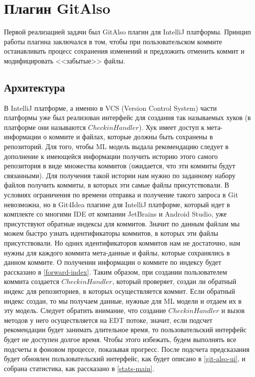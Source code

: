 \documentclass[times]{itmo-student-thesis}
\begin{document}
\section{Плагин GitAlso}
Первой реализацией задачи был GitAlso плагин для IntelliJ платформы. Принцип работы плагина заключался в том, чтобы при пользовательском коммите останавливать процесс сохранения изменений и предложить отменить коммит и модифицировать <<забытые>> файлы.
\subsection{Архитектура}
В IntelliJ платформе, а именно в VCS (Version Control System) части платформы уже был реализован интерфейс для создания так называемых хуков (в платформе они называются $CheckinHandler$). Хук имеет доступ к мета-информации о коммите и файлах, которые должны быть сохранены в репозиторий. Для того, чтобы ML модель выдала рекомендацию следует в дополнение к имеющейся информации получить историю этого самого репозитория в виде множества коммитов (ожидается, что эти коммиты будут связанными). Для получения такой истории нам нужно по заданному набору файлов получить коммиты, в которых эти самые файлы присутствовали. В условиях ограничения по времени отправка и получение такого запроса в Git невозможна, но в Git4Idea плагине для IntelliJ платформе, который идет в комплекте со многими IDE от компании JetBrains и Android Studio, уже присутствуют обратные индексы для коммитов. Значит по данным файлам мы можем быстро узнать идентификаторы коммитов, в которых эти файлы присутствовали. Но одних идентификаторов коммитов нам не достаточно, нам нужны для каждого коммита мета-данные и файлы, которые сохранялись в данном коммите. О получении информации о коммите по индексу будет рассказано в \ref{forward-index}. Таким образом, при создании пользователем коммита создается $CheckinHandler$, который проверяет, создан ли обратный индекс для репозиториев, в которых осуществляется коммит. Если обратный индекс создан, то мы получаем данные, нужные для ML модели и отдаем их в эту модель. Следует обратить внимание, что создание $CheckinHandler$ и вызов методов у него осуществляется на EDT потоке, значит, если подсчет рекомендации будет занимать длительное время, то пользовательский интерфейс будет не доступен долгое время. Чтобы этого избежать, будем выполнять все подсчеты в фоновом процессе, показывая прогресс. После подсчета предсказания будет обновлен пользовательский интерфейс, как будет описано в \ref{git-also-ui}, и собрана статистика, как рассказано в \ref{stats-main}.
\end{document}

